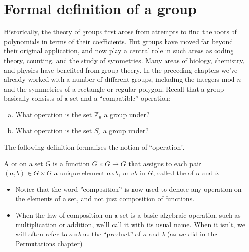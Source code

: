 \section{Formal definition of a group}\label{groups_section_define}

Historically, the theory of groups first arose from attempts to find the roots of polynomials in terms of their coefficients.  But groups have moved far beyond their original application, and now play a central role in such areas as coding theory, counting, and the study of  symmetries. Many areas of biology, chemistry, and physics have benefited from group theory. In the preceding chapters we've already worked with a number of different groups, including the integers mod $n$ and the symmetries of a rectangle or regular polygon. Recall that a group basically consists of a set and a ``compatible'' operation:

\begin{exercise}{}
\begin{enumerate}[(a)]
\item
What operation is the set ${\mathbb Z}_n$ a group under?
\item
What operation is the set $S_3$ a group under?
\end{enumerate}
\end{exercise}
The following definition formalizes the notion of ``operation''.

\begin{defn} \label{group_op}
 A  or  on a set $G$ is a function $G \times G \rightarrow G$ that assigns to each pair $(a,b) \in G \times G$ a unique element $a \circ b$, or $ab$ in $G$, called the  of $a$ and $b$.
\end{defn}

\begin{rem}
\begin{itemize}
\item
Notice that the word ''composition'' is now used to denote any operation on the elements of a set, and not just composition of functions.
\item
When the law of composition on a set is a basic algebraic operation such as multiplication or addition, we'll call it with its usual name.  When it isn't, we will often refer to $a \circ b$  as the ``product'' of $a$ and $b$  (as we did in the Permutations chapter).
\end{itemize}
\end{rem}

